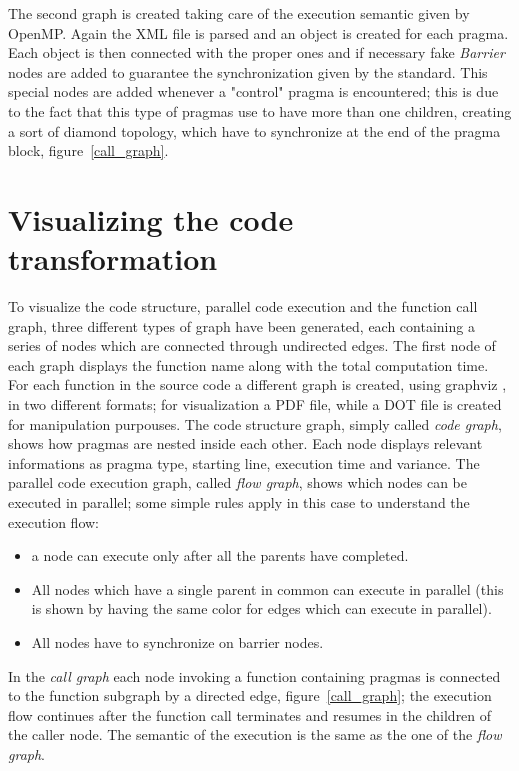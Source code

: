 \documentclass[a4paper,12pt,oneside]{book}
\begin{document}
The second graph is created taking care of the execution semantic given by OpenMP. Again the XML file is parsed and an object is created for each pragma. Each object is then connected with the proper ones and if necessary fake \emph{Barrier} nodes are added to guarantee the synchronization given by the standard. This special nodes are added whenever a "control" pragma is encountered; this is due to the fact that this type of pragmas use to have more than one children, creating a sort of diamond topology, which have to synchronize at the end of the pragma block, figure~\ref{call_graph}.

\section{Visualizing the code transformation}

To visualize the code structure, parallel code execution and the function call graph, three different types of graph have been generated, each containing a series of nodes which are connected through undirected edges. The first node of each graph displays the function name along with the total computation time. For each function in the source code a different graph is created, using graphviz \cite{graphviz},  in two different formats; for visualization a PDF file, while a DOT file is created for manipulation purpouses. The code structure graph, simply called \emph{code graph}, shows how pragmas are nested inside each other. Each node displays relevant informations as pragma type, starting line, execution time and variance. The parallel code execution graph, called \emph{flow graph}, shows which nodes can be executed in parallel; some simple rules apply in this case to understand the execution flow:
\begin{itemize}
\item{a node can execute only after all the parents have completed.}
\item{All nodes which have a single parent in common can execute in parallel (this is shown by having the same color for edges which can execute in parallel).}
\item{All nodes have to synchronize on barrier nodes.}
\end{itemize}
In the \emph{call graph} each node invoking a function containing pragmas is connected to the function subgraph by a directed edge, figure~\ref{call_graph}; the execution flow continues after the function call terminates and resumes in the children of the caller node. The semantic of the execution is the same as the one of the \emph{flow graph}.
\end{document}
